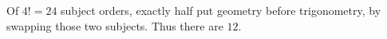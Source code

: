Of $4!=24$ subject orders, exactly half put geometry before trigonometry, by swapping those two subjects. Thus there are $\boxed{12}$.
